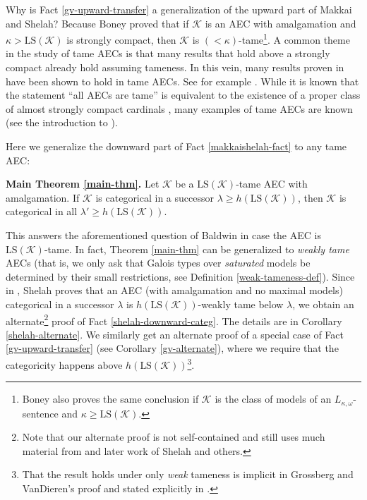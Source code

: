 \documentclass[12pt]{amsart}
\theoremstyle{definition}
\begin{document}
Why is Fact \ref{gv-upward-transfer} a generalization of the upward part of Makkai and Shelah? Because Boney \cite{tamelc-jsl} proved that if ${\mathcal{K}}$ is an AEC with amalgamation and $\kappa > {\text{LS}} ({\mathcal{K}})$ is strongly compact, then ${\mathcal{K}}$ is $(<\kappa)$-tame\footnote{Boney also proves the same conclusion if ${\mathcal{K}}$ is the class of models of an $L_{\kappa, \omega}$-sentence and $\kappa \ge {\text{LS}} ({\mathcal{K}})$.}. A common theme in the study of tame AECs is that many results that hold above a strongly compact already hold assuming tameness. In this vein, many results proven in \cite{makkaishelah} have been shown to hold in tame AECs. See for example \cite{b-k-vd-spectrum, bg-v9, ss-tame-toappear-v3, bv-sat-v3, sv-infinitary-stability-v3, indep-aec-v5}. While it is known that the statement ``all AECs are tame'' is equivalent to the existence of a proper class of almost strongly compact cardinals \cite{lc-tame-v2}, many examples of tame AECs are known (see the introduction to \cite{tamenessone}).

Here we generalize the downward part of Fact \ref{makkaishelah-fact} to any tame AEC:

\textbf{Main Theorem \ref{main-thm}.}
Let ${\mathcal{K}}$ be a ${\text{LS}} ({\mathcal{K}})$-tame AEC with amalgamation. If ${\mathcal{K}}$ is categorical in a successor $\lambda \ge {h ({{\text{LS}} ({\mathcal{K}})})}$, then ${\mathcal{K}}$ is categorical in all $\lambda' \ge {h ({{\text{LS}} ({\mathcal{K}})})}$.

This answers the aforementioned question of Baldwin in case the AEC is ${\text{LS}} ({\mathcal{K}})$-tame. In fact, Theorem \ref{main-thm} can be generalized to \emph{weakly tame} AECs (that is, we only ask that Galois types over \emph{saturated} models be determined by their small restrictions, see Definition \ref{weak-tameness-def}). Since in \cite[Main Claim II.2.3]{sh394}, Shelah proves that an AEC (with amalgamation and no maximal models) categorical in a successor $\lambda$ is ${h ({{\text{LS}} ({\mathcal{K}})})}$-weakly tame below $\lambda$, we obtain an alternate\footnote{Note that our alternate proof is not self-contained and still uses much material from \cite{sh394} and later work of Shelah and others.} proof of Fact \ref{shelah-downward-categ}. The details are in Corollary \ref{shelah-alternate}. We similarly get an alternate proof of a special case of Fact \ref{gv-upward-transfer} (see Corollary \ref{gv-alternate}), where we require that the categoricity happens above ${h ({{\text{LS}} ({\mathcal{K}})})}$\footnote{That the result holds under only \emph{weak} tameness is implicit in Grossberg and VanDieren's proof and stated explicitly in \cite[Theorem 15.11.(2)]{baldwinbook09}.}.
\end{document}
